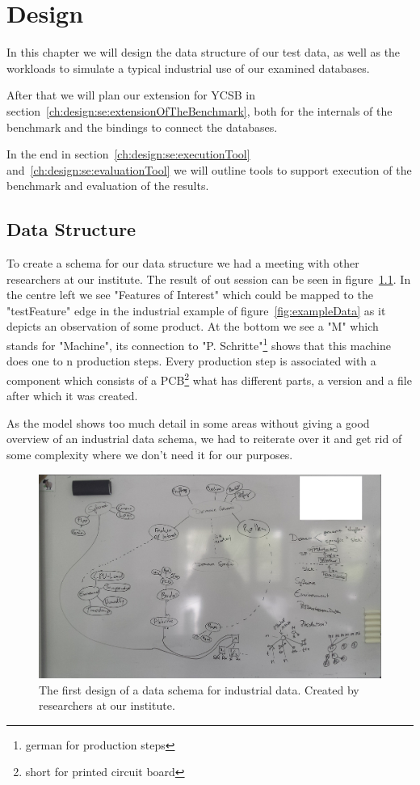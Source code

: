 \chapter{Design}
\label{ch:design}
In this chapter we will design the data structure of our test data,
as well as the workloads to simulate a typical industrial use of our examined databases.

After that we will plan our extension for YCSB in section~\ref{ch:design:se:extensionOfTheBenchmark},
both for the internals of the benchmark and the bindings to connect the databases.

In the end in section~\ref{ch:design:se:executionTool} and~\ref{ch:design:se:evaluationTool} we will outline tools to support execution of the benchmark and evaluation of the results.

\section{Data Structure}
\label{ch:design:se:dataStructure}
To create a schema for our data structure we had a meeting with other researchers at our institute.
The result of out session can be seen in figure~\ref{fig:firstDesignOfSchema}.
In the centre left we see "Features of Interest" which could be mapped to the "testFeature" edge in the industrial example of figure~\ref{fig:exampleData} as it depicts an observation of some product.
At the bottom we see a "M" which stands for "Machine",
its connection to "P. Schritte"\footnote{german for production steps} shows that this machine does one to n production steps.
Every production step is associated with a component which consists of a PCB\footnote{short for printed circuit board} what has different parts,
a version and a file after which it was created.

As the model shows too much detail in some areas without giving a good overview of an industrial data schema,
we had to reiterate over it and get rid of some complexity where we don't need it for our purposes.

\begin{figure}
  \centering
  \includegraphics[width=\textwidth]{images/design/firstDesignOfSchema}
  \caption{The first design of a data schema for industrial data. Created by researchers at our institute.}
  \label{fig:firstDesignOfSchema}
\end{figure}

